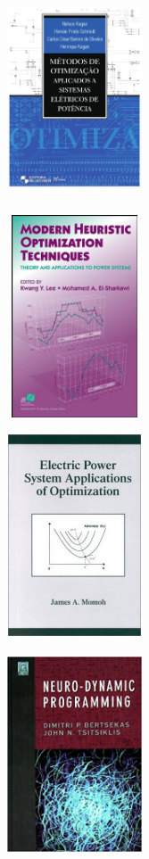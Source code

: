 \documentclass{beamer}
\begin{document}
\begin{frame}
{
	\begin{figure}[!htb]
		\includegraphics[width=4cm, height=6cm]{kagan.jpg}
	\end{figure}
}

{
	\begin{figure}[!htb]
		\includegraphics[width=4cm, height=6cm]{modernheuristiques.jpg}
	\end{figure}
}

{
	\begin{figure}[!htb]
		\includegraphics[width=4cm, height=6cm]{momoh.jpg}
	\end{figure}
}

{
	\begin{figure}[!htb]
		\includegraphics[width=4cm, height=6cm]{neurobertsekas.jpg}
	\end{figure}
}


\end{frame}
\end{document}
